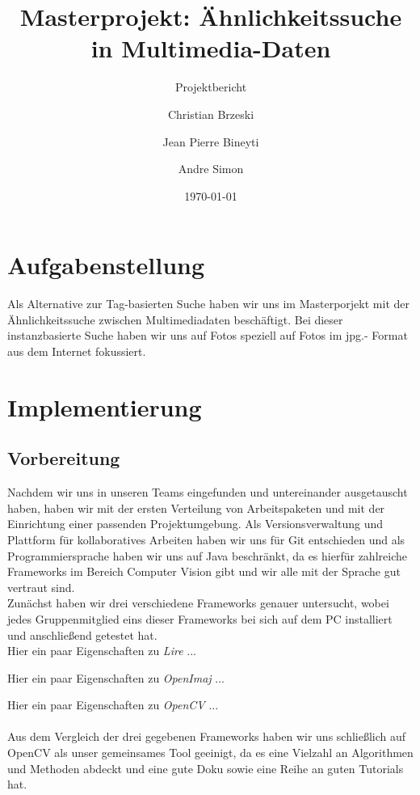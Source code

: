 \documentclass{scrartcl}
\title{Masterprojekt: Ähnlichkeitssuche in Multimedia-Daten}
\subtitle{Projektbericht}
\author{Christian Brzeski \and Jean Pierre Bineyti\and Andre Simon}
\date{\today}
\begin{document}
\maketitle

\section{Aufgabenstellung}
Als Alternative zur Tag-basierten Suche haben wir uns im Masterporjekt mit der Ähnlichkeitssuche zwischen Multimediadaten beschäftigt. Bei dieser instanzbasierte Suche haben wir uns auf Fotos speziell auf Fotos im jpg.- Format aus dem Internet fokussiert. 

\section{Implementierung}

\subsection{Vorbereitung}

Nachdem wir uns in unseren Teams eingefunden und untereinander ausgetauscht haben, haben wir mit der ersten Verteilung von Arbeitspaketen und mit der Einrichtung einer passenden Projektumgebung. Als Versionsverwaltung und Plattform für kollaboratives Arbeiten haben wir uns für Git entschieden und als Programmiersprache haben wir uns auf Java beschränkt, da es hierfür zahlreiche Frameworks im Bereich Computer Vision gibt und wir alle mit der Sprache gut vertraut sind. 
\\

Zunächst haben wir drei verschiedene Frameworks genauer untersucht, wobei jedes Gruppenmitglied eins dieser Frameworks bei sich auf dem PC installiert und anschließend getestet hat. 
\\

Hier ein paar Eigenschaften zu \textit{Lire} ...

Hier ein paar Eigenschaften zu \textit{OpenImaj} ...

Hier ein paar Eigenschaften zu \textit{OpenCV} ...
\\
\\
Aus dem Vergleich der drei gegebenen Frameworks haben wir uns schließlich auf OpenCV als unser gemeinsames Tool geeinigt, da es eine Vielzahl an Algorithmen und Methoden abdeckt und eine gute Doku sowie eine Reihe an guten Tutorials hat.
\\
\end{document}
